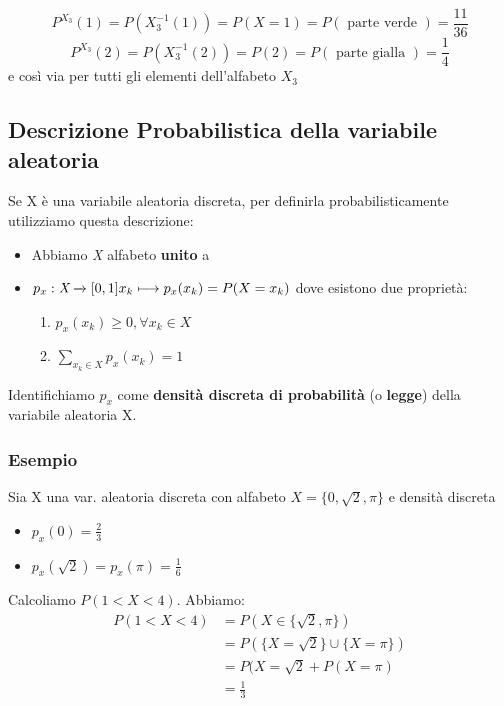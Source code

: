 \documentclass{report}
\begin{document}
\begin{enumerate}
\begin{figure}[hb]
        \caption{}
        \label{fig:Esempio2Lez7}
    \end{figure}
    \[P^{X_3}(1) = P(X_3^{-1}(1)) = P(X = 1) = P(\text{ parte verde }) = \frac{11}{36}\]
    \[P^{X_3}(2) = P(X_3^{-1}(2)) = P(2) = P(\text{ parte gialla }) = \frac{1}{4}\]
    e così via per tutti gli elementi dell'alfabeto \(X_3\)
\end{enumerate}
\subsection{Descrizione Probabilistica della variabile aleatoria}
Se X è una variabile aleatoria discreta, per definirla probabilisticamente utilizziamo questa descrizione:
\begin{itemize}
    \item Abbiamo \textit{X} alfabeto \textbf{unito} a 
    \item \(p_x: \textit{X} \xrightarrow{}[0,1]\\
    x_k \longmapsto p_x(x_k) = P(X = x_k)\) dove esistono due proprietà: \begin{enumerate}
        \item \(p_x(x_k) \geq 0, \forall x_k \in \textit{X}\)
        \item \(\sum_{x_k \in \textit{X}} p_x(x_k) = 1\)
    \end{enumerate}
\end{itemize}
Identifichiamo \(p_x\) come \textbf{densità discreta di probabilità} (o \textbf{legge}) della variabile aleatoria X.
\subsubsection{Esempio}
Sia X una var. aleatoria discreta con alfabeto \(\textit{X}=\{0, \sqrt{2}, \pi\}\) e densità discreta \begin{itemize}
    \item \(p_x(0) = \frac{2}{3}\)
    \item \(p_x(\sqrt{2}) = p_x(\pi) = \frac{1}{6}\)
\end{itemize}
Calcoliamo \(P(1 < X < 4)\). Abbiamo:  
\begin{align}
P(1 < X < 4) & = P(X \in \{\sqrt{2}, \pi\})\\
& = P(\{X = \sqrt{2}\} \cup \{X = \pi\})\\
& = P(X = \sqrt{2} + P(X = \pi)\\
& = \frac{1}{3}    
\end{align}
\end{document}
